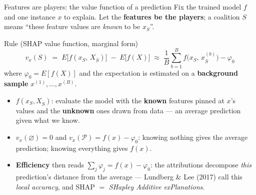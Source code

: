 \documentclass[aspectratio=169,11pt]{beamer}
\begin{document}
\begin{frame}{Features are players: the value function of a prediction}
  Fix the trained model $f$ and one instance $x$ to explain. Let the
  \textbf{features be the players}; a coalition $S$ means ``these feature values
  are \emph{known} to be $x_S$''.
  \begin{block}{Rule (SHAP value function, marginal form)}
    \[
      \boxed{\;v_x(S) \;=\; E\bigl[f(x_S,\,X_{\bar S})\bigr] \;-\; E\bigl[f(X)\bigr]
      \;\approx\; \frac1B\sum_{b=1}^{B} f\bigl(x_S,\,x^{(b)}_{\bar S}\bigr) - \varphi_0\;}
    \]
    where $\varphi_0 = E[f(X)]$ and the expectation is estimated on a
    \textbf{background sample} $x^{(1)},\dots,x^{(B)}$.
  \end{block}
  \begin{readme}
    \begin{itemize}
      \item $f(x_S, X_{\bar S})$: evaluate the model with the \textbf{known}
            features pinned at $x$'s values and the \textbf{unknown} ones drawn
            from data --- an average prediction given what we know.
      \item $v_x(\varnothing)=0$ and $v_x(\mathcal{P})=f(x)-\varphi_0$: knowing
            nothing gives the average prediction; knowing everything gives $f(x)$.
      \item \textbf{Efficiency} then reads $\sum_j \varphi_j = f(x) - \varphi_0$:
            the attributions decompose \emph{this} prediction's distance from the
            average --- Lundberg \& Lee (2017) call this \emph{local accuracy},
            and SHAP $=$ \emph{SHapley Additive exPlanations}.
    \end{itemize}
  \end{readme}
\end{frame}
\end{document}
